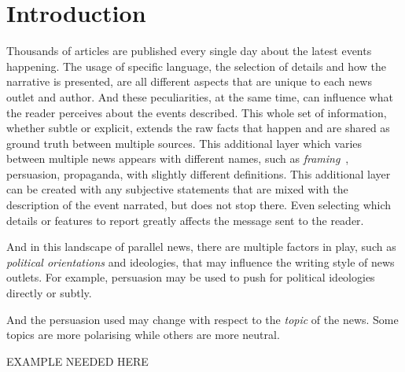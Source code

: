 \chapter{\statusorange Introduction}
\label{chap:intro}


Thousands of articles are published every single day about the latest events happening.
The usage of specific language, the selection of details and how the narrative is presented, are all different aspects that are unique to each news outlet and author.
And these peculiarities, at the same time, can influence what the reader perceives about the events described.
This whole set of information, whether subtle or explicit, extends the raw facts that happen and are shared as ground truth between multiple sources. This additional layer which varies between multiple news appears with different names, such as \emph{framing}~\cite{gamson1989media,scheufele1999framing}, persuasion, propaganda, with slightly different definitions.
This additional layer can be created with any subjective statements that are mixed with the description of the event narrated, but does not stop there.
Even selecting which details or features to report greatly affects the message sent to the reader.

And in this landscape of parallel news, there are multiple factors in play, such as \textit{political orientations} and ideologies, that may influence the writing style of news outlets.
For example, persuasion may be used to push for political ideologies directly or subtly.

And the persuasion used may change with respect to the \emph{topic} of the news. Some topics are more polarising while others are more neutral.

EXAMPLE NEEDED HERE



